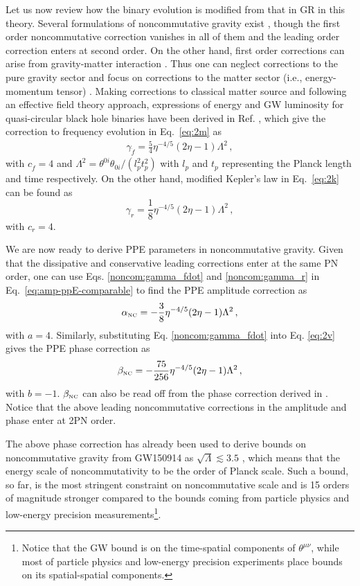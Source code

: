 \documentclass[prd,twocolumn,nofootinbib]{revtex4-1}
\newcommand\be{\begin{equation}}
\newcommand\ba{\begin{eqnarray}}
\newcommand\ee{\end{equation}}
\newcommand\ea{\end{eqnarray}}
\newcommand{\NC}{{\mbox{\tiny NC}}}
\begin{document}
Let us now review how the binary evolution is modified from that in GR in this theory.
Several formulations of noncommutative gravity exist \cite{Aschieri:2005yw,Aschieri:2005zs,Calmet:2005qm,Chamseddine:2000si,Kobakhidze:2006kb,Szabo:2006wx}, though the first order noncommutative correction vanishes in all of them \cite{Calmet:2006iz,Mukherjee:2006nd} and the leading order correction enters at second order. On the other hand, first order  corrections can arise from gravity-matter interaction \cite{Kobakhidze:2007jn,Mukherjee:2006nd}. Thus one can neglect corrections to the pure gravity sector and focus on corrections to the matter sector (i.e., energy-momentum tensor) \cite{Kobakhidze:2016cqh}. Making corrections to classical matter source and following an effective field theory approach, expressions of energy and GW luminosity for quasi-circular black hole binaries have been derived in Ref. \cite{Kobakhidze:2016cqh}, which give the correction to frequency evolution in Eq.~\eqref{eq:2m} as
\ba \label{noncom:gamma_fdot}
\gamma_{\dot{f}}=\frac{5}{4}\eta ^{-4/5}(2 \eta -1)\Lambda^2\,,
\ea
with $c_{\dot{f}}=4$ and $\Lambda^2 = \theta^{0i} \theta_{0i}/(l_p^2 t_p^2)$ with $l_p$ and $t_p$ representing the Planck length and time respectively. On the other hand, modified Kepler's law in Eq.~\eqref{eq:2k} can be found as \cite{Kobakhidze:2016cqh}
\be \label{noncom:gamma_r}
\gamma_r=\frac{1}{8}\eta ^{-4/5}(2 \eta -1)\Lambda^2\,,
\ee
with $c_r=4$. 

We are now ready to derive PPE parameters in noncommutative gravity.
Given that the dissipative and conservative leading corrections enter at the same PN order, one can use Eqs. \eqref{noncom:gamma_fdot} and \eqref{noncom:gamma_r} in Eq.~\eqref{eq:amp-ppE-comparable} to find the PPE amplitude correction as
\begin{equation}
 \alpha_{\NC}=-\frac{3}{8}\eta ^{-4/5}(2 \eta -1) \Lambda ^2\,,
 \end{equation}
with $a=4$. Similarly, substituting Eq. \eqref{noncom:gamma_fdot} into Eq. \eqref{eq:2v} gives the PPE phase correction as
 \begin{equation}
 \beta_{\NC}=-\frac{75}{256}\eta ^{-4/5}(2 \eta -1) \Lambda ^2\,, 
 \end{equation}
with $b=-1$. $\beta_{\NC}$ can also be read off from the phase correction derived in \cite{Kobakhidze:2016cqh}.
 Notice that the above leading noncommutative corrections in the amplitude and phase enter at 2PN order. 

The above phase correction has already been used to derive bounds on noncommutative gravity from GW150914 as $\sqrt{\Lambda} \lesssim 3.5$ \cite{Kobakhidze:2016cqh}, which means that the energy scale of noncommutativity to be the order of Planck scale. Such a bound, so far, is the most stringent constraint on noncommutative scale and is 15 orders of magnitude stronger compared to the bounds coming from particle physics and low-energy precision measurements\footnote{Notice that the GW bound is on the time-spatial components of $\theta^{\mu\nu}$, while most of particle physics and low-energy precision experiments place bounds on its spatial-spatial components.}.
 
\end{document}
